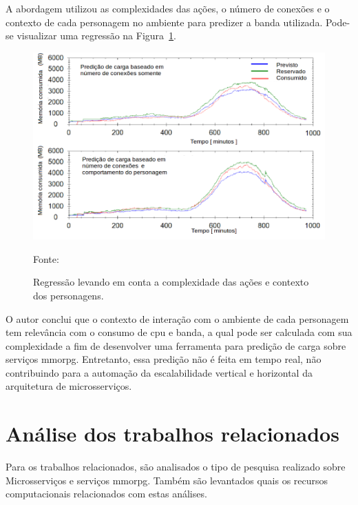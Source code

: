 A abordagem utilizou as complexidades das ações, o número de conexões e o contexto de cada personagem no ambiente para predizer a banda utilizada.
%
Pode-se visualizar uma regressão na Figura~\ref{fig:regressao_complexidade}.

\begin{figure}[htb!]
\caption{Regressão levando em conta a complexidade das ações e contexto dos personagens.}
\label{fig:regressao_complexidade}
\includegraphics[width=\textwidth]{img/cap2/network_regressao_complexidade.png}
\centering

Fonte:~\cite{6374456}
\end{figure}






O autor conclui que o contexto de interação com o ambiente de cada personagem tem relevância com o consumo de \ac{cpu} e banda, a qual pode ser calculada com sua complexidade a fim de desenvolver uma ferramenta para predição de carga sobre serviços \ac{mmorpg}.
%
Entretanto, essa predição não é feita em tempo real, não contribuindo para a automação da escalabilidade vertical e horizontal da arquitetura de microsserviços.



\section{Análise dos trabalhos relacionados}
\label{sec:similares_analise}



Para os trabalhos relacionados, são analisados o tipo de pesquisa realizado sobre Microsserviços e serviços \ac{mmorpg}.
%
Também são levantados quais os recursos computacionais relacionados com estas análises.


